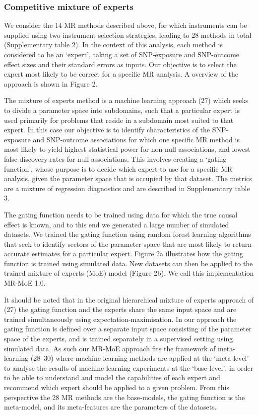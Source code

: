 \documentclass[]{article}
\begin{document}
\subsubsection{Competitive mixture of
experts}\label{competitive-mixture-of-experts}

We consider the 14 MR methods described above, for which instruments can
be supplied using two instrument selection strategies, leading to 28
methods in total (Supplementary table 2). In the context of this
analysis, each method is considered to be an `expert', taking a set of
SNP-exposure and SNP-outcome effect sizes and their standard errors as
inputs. Our objective is to select the expert most likely to be correct
for a specific MR analysis. A overview of the approach is shown in
Figure 2.

The mixture of experts method is a machine learning approach (27) which
seeks to divide a parameter space into subdomains, such that a
particular expert is used primarily for problems that reside in a
subdomain most suited to that expert. In this case our objective is to
identify characteristics of the SNP-exposure and SNP-outcome
associations for which one specific MR method is most likely to yield
highest statistical power for non-null associations, and lowest false
discovery rates for null associations. This involves creating a `gating
function', whose purpose is to decide which expert to use for a specific
MR analysis, given the parameter space that is occupied by that dataset.
The metrics are a mixture of regression diagnostics and are described in
Supplementary table 3.

The gating function needs to be trained using data for which the true
causal effect is known, and to this end we generated a large number of
simulated datasets. We trained the gating function using random forest
learning algorithms that seek to identify sectors of the parameter space
that are most likely to return accurate estimates for a particular
expert. Figure 2a illustrates how the gating function is trained using
simulated data. New datasets can then be applied to the trained mixture
of experts (MoE) model (Figure 2b). We call this implementation MR-MoE
1.0.

It should be noted that in the original hierarchical mixture of experts
approach of (27) the gating function and the experts share the same
input space and are trained simultaneously using
expectation-maximisation. In our approach the gating function is defined
over a separate input space consisting of the parameter space of the
experts, and is trained separately in a supervised setting using
simulated data. As such our MR-MoE approach fits the framework of
meta-learning (28--30) where machine learning methods are applied at the
`meta-level' to analyse the results of machine learning experiments at
the `base-level', in order to be able to understand and model the
capabilities of each expert and recommend which expert should be applied
to a given problem. From this perspective the 28 MR methods are the
base-models, the gating function is the meta-model, and its
meta-features are the parameters of the datasets.
\end{document}

